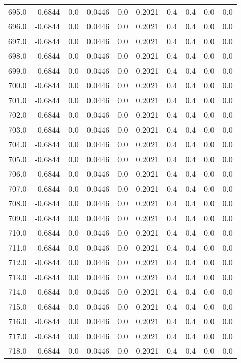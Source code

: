 \begin{longtable}{lrrrrrrrrr}
695.0 & -0.6844 & 0.0 & 0.0446 & 0.0 & 0.2021 & 0.4 & 0.4 & 0.0 & 0.0 \\
696.0 & -0.6844 & 0.0 & 0.0446 & 0.0 & 0.2021 & 0.4 & 0.4 & 0.0 & 0.0 \\
697.0 & -0.6844 & 0.0 & 0.0446 & 0.0 & 0.2021 & 0.4 & 0.4 & 0.0 & 0.0 \\
698.0 & -0.6844 & 0.0 & 0.0446 & 0.0 & 0.2021 & 0.4 & 0.4 & 0.0 & 0.0 \\
699.0 & -0.6844 & 0.0 & 0.0446 & 0.0 & 0.2021 & 0.4 & 0.4 & 0.0 & 0.0 \\
700.0 & -0.6844 & 0.0 & 0.0446 & 0.0 & 0.2021 & 0.4 & 0.4 & 0.0 & 0.0 \\
701.0 & -0.6844 & 0.0 & 0.0446 & 0.0 & 0.2021 & 0.4 & 0.4 & 0.0 & 0.0 \\
702.0 & -0.6844 & 0.0 & 0.0446 & 0.0 & 0.2021 & 0.4 & 0.4 & 0.0 & 0.0 \\
703.0 & -0.6844 & 0.0 & 0.0446 & 0.0 & 0.2021 & 0.4 & 0.4 & 0.0 & 0.0 \\
704.0 & -0.6844 & 0.0 & 0.0446 & 0.0 & 0.2021 & 0.4 & 0.4 & 0.0 & 0.0 \\
705.0 & -0.6844 & 0.0 & 0.0446 & 0.0 & 0.2021 & 0.4 & 0.4 & 0.0 & 0.0 \\
706.0 & -0.6844 & 0.0 & 0.0446 & 0.0 & 0.2021 & 0.4 & 0.4 & 0.0 & 0.0 \\
707.0 & -0.6844 & 0.0 & 0.0446 & 0.0 & 0.2021 & 0.4 & 0.4 & 0.0 & 0.0 \\
708.0 & -0.6844 & 0.0 & 0.0446 & 0.0 & 0.2021 & 0.4 & 0.4 & 0.0 & 0.0 \\
709.0 & -0.6844 & 0.0 & 0.0446 & 0.0 & 0.2021 & 0.4 & 0.4 & 0.0 & 0.0 \\
710.0 & -0.6844 & 0.0 & 0.0446 & 0.0 & 0.2021 & 0.4 & 0.4 & 0.0 & 0.0 \\
711.0 & -0.6844 & 0.0 & 0.0446 & 0.0 & 0.2021 & 0.4 & 0.4 & 0.0 & 0.0 \\
712.0 & -0.6844 & 0.0 & 0.0446 & 0.0 & 0.2021 & 0.4 & 0.4 & 0.0 & 0.0 \\
713.0 & -0.6844 & 0.0 & 0.0446 & 0.0 & 0.2021 & 0.4 & 0.4 & 0.0 & 0.0 \\
714.0 & -0.6844 & 0.0 & 0.0446 & 0.0 & 0.2021 & 0.4 & 0.4 & 0.0 & 0.0 \\
715.0 & -0.6844 & 0.0 & 0.0446 & 0.0 & 0.2021 & 0.4 & 0.4 & 0.0 & 0.0 \\
716.0 & -0.6844 & 0.0 & 0.0446 & 0.0 & 0.2021 & 0.4 & 0.4 & 0.0 & 0.0 \\
717.0 & -0.6844 & 0.0 & 0.0446 & 0.0 & 0.2021 & 0.4 & 0.4 & 0.0 & 0.0 \\
718.0 & -0.6844 & 0.0 & 0.0446 & 0.0 & 0.2021 & 0.4 & 0.4 & 0.0 & 0.0 \\

\end{longtable}
